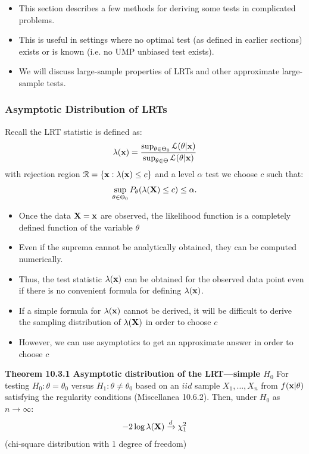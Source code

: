\documentclass[11pt,]{article}
\newcommand{\Xndots}{X_1, \ldots, X_n}
\def\bx{{\bf x}}
\def\bX{{\bf X}}
\def\Lsc{{\cal L}}
\def\Rsc{{\cal R}}
\begin{document}
\begin{itemize}
\item This section describes a few methods for deriving some tests in complicated problems.
\item This is useful in settings where no optimal test (as defined in earlier sections) exists or is known (i.e. no UMP unbiased test exists).
\item We will discuss large-sample properties of LRTs and other approximate large-sample tests.
\end{itemize}

\subsubsection{Asymptotic Distribution of LRTs}

Recall the LRT statistic is defined as:
\[\lambda(\bx) = \frac{\sup_{\theta \in \Theta_0} \Lsc(\theta|\bx)}{\sup_{\theta \in \Theta} \Lsc(\theta|\bx)}\]
with rejection region \(\Rsc = \{ \bx: \lambda(\bx) \leq c \}\) and a
level \(\alpha\) test we choose \(c\) such that:
\[\sup_{\theta \in \Theta_0} P_\theta(\lambda(\bX) \leq c) \leq \alpha.\]

\begin{itemize}
\item Once the data $\bX = \bx$ are observed, the likelihood function is a completely defined function of the variable $\theta$
\item Even if the suprema cannot be analytically obtained, they can be computed numerically.
\item Thus, the test statistic $\lambda(\bx)$ can be obtained for the observed data point even if there is no convenient formula for defining $\lambda(\bx)$.
\item If a simple formula for $\lambda(\bx)$ cannot be derived, it will be difficult to derive the sampling distribution of $\lambda(\bX)$ in order to choose $c$
\item However, we can use asymptotics to get an approximate answer in order to choose $c$
\end{itemize}

\noindent\textbf{Theorem 10.3.1 Asymptotic distribution of the LRT---simple $H_0$}
For testing \(H_0: \theta = \theta_0\) versus
\(H_1: \theta \neq \theta_0\) based on an \(iid\) sample \(\Xndots\)
from \(f(\bx|\theta)\) satisfying the regularity conditions (Miscellanea
10.6.2). Then, under \(H_0\) as \(n\to \infty\):
\[-2 \log \lambda(\bX) \xrightarrow{d} \chi^2_1\] (chi-square
distribution with 1 degree of freedom)
\end{document}
